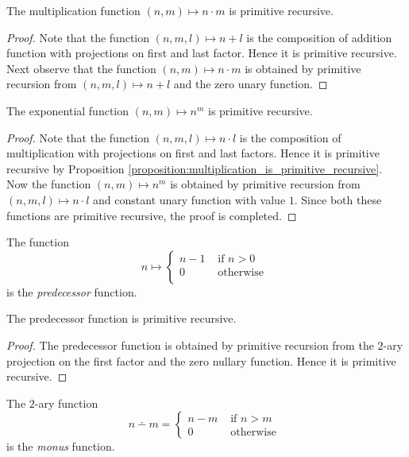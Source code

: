 \documentclass[10pt]{amsart}
\begin{document}
\begin{proposition}\label{proposition:multiplication_is_primitive_recursive}
	The multiplication function $(n,m) \mapsto n\cdot m$ is primitive recursive.
\end{proposition}
\begin{proof}
	Note that the function $(n,m,l)\mapsto n + l$ is the composition of addition function with projections on first and last factor. Hence it is primitive recursive. Next observe that the function $(n,m)\mapsto n\cdot m$ is obtained by primitive recursion from $(n,m,l) \mapsto n + l$ and the zero unary function.
\end{proof}

\begin{proposition}\label{proposition:power_function_is_primitive_recursive}
	The exponential function $(n,m) \mapsto n^m$ is primitive recursive.
\end{proposition}
\begin{proof}
	Note that the function $(n,m,l) \mapsto n\cdot l$ is the composition of multiplication with projections on first and last factors. Hence it is primitive recursive  by Proposition \ref{proposition:multiplication_is_primitive_recursive}. Now the function $(n, m) \mapsto n^m$ is obtained by primitive recursion from $(n,m,l) \mapsto n\cdot l$ and constant unary function with value $1$. Since both these functions are primitive recursive, the proof is completed.
\end{proof}

\begin{definition}
	The function
	$$n \mapsto \begin{cases}
			n - 1 & \mbox{ if }n > 0   \\
			0     & \mbox{ otherwise } \\
		\end{cases}$$
	is the \textit{predecessor} function.
\end{definition}

\begin{proposition}\label{proposition:predecessor_function_is_primitive_recursive}
	The predecessor function is primitive recursive.
\end{proposition}
\begin{proof}
	The predecessor function is obtained by primitive recursion from the $2$-ary projection on the first factor and the zero nullary function. Hence it is primitive recursive.
\end{proof}

\begin{definition}
	The $2$-ary function
	$$n \dotminus m = \begin{cases}
			n - m & \mbox{ if }n > m   \\
			0     & \mbox{ otherwise }
		\end{cases}$$
	is the \textit{monus} function.
\end{definition}
\end{document}

